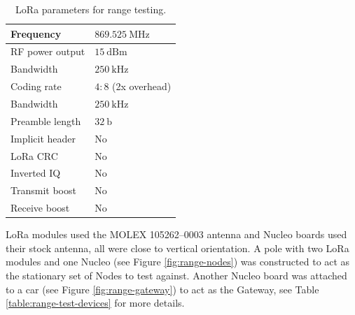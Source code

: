 \begin{table}[H]
\begin{center}
\caption{\label{table:range-test-parameters}LoRa parameters for range testing.}
    \begin{tabular}{|l|l|} \hline
    Frequency             & $869.525~\mathrm{MHz}$\\ \hline
    RF power output       & $15~\mathrm{dBm}$\\ \hline
    Bandwidth             & $250~\mathrm{kHz}$\\ \hline
    Coding rate           & $4:8$ (2x overhead) \\ \hline
    Bandwidth             & $250~\mathrm{kHz}$\\ \hline
    Preamble length       & $32~\mathrm{b}$\\ \hline
    Implicit header       & No\\ \hline
    LoRa CRC              & No\\ \hline
    Inverted IQ           & No\\ \hline
    Transmit boost        & No\\ \hline
    Receive boost         & No\\ \hline
    \end{tabular}
\end{center}
\end{table}

LoRa modules used the MOLEX 105262--0003 antenna and Nucleo boards used their stock antenna, all were close to vertical orientation. A pole with two LoRa modules and one Nucleo (see Figure \ref{fig:range-nodes}) was constructed to act as the stationary set of Nodes to test against. Another Nucleo board was attached to a car (see Figure \ref{fig:range-gateway}) to act as the Gateway, see Table \ref{table:range-test-devices} for more details.

